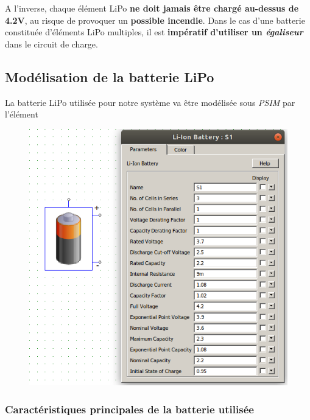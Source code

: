 \documentclass[a4paper,12pt]{book}
\begin{document}
		A l'inverse, chaque élément LiPo \textbf{ne doit jamais être chargé au-dessus de 4.2V}, au risque de provoquer un \textbf{possible incendie}. Dans le cas d'une batterie constituée d'éléments LiPo multiples, il est \textbf{impératif d'utiliser un \textit{égaliseur}} dans le circuit de charge.
		
			
			\subsection{Modélisation de la batterie LiPo}
			
			La batterie LiPo utilisée pour notre système va être modélisée sous \textit{PSIM} par l'élément 
			
			\begin{figure}[h]
				\begin{center}
					\includegraphics[scale=0.5]{../Illus/lipo_model_psim.png}
				\end{center}
			\end{figure}
			
				\subsubsection{Caractéristiques principales de la batterie utilisée}
			
\end{document}
